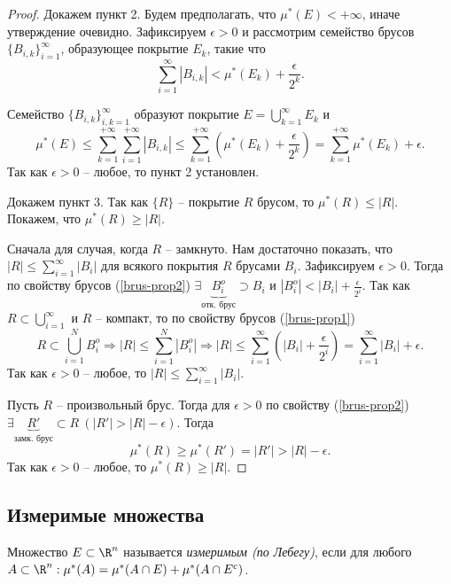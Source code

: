 \begin{proof}
    Докажем пункт 2. Будем предполагать, что $\mu^{*}(E) < +\infty$, иначе утверждение очевидно. Зафиксируем $\epsilon > 0$ и рассмотрим семейство брусов $\{B_{i, k}\}_{i = 1}^{\infty}$, образующее покрытие $E_{k}$, такие что
    \[\sum_{i = 1}^{\infty}|B_{i, k}| < \mu^{*}(E_{k}) + \frac{\epsilon}{2^{k}}.\]

    Семейство $\{B_{i, k}\}_{i, k = 1}^{\infty}$ образуют покрытие $E = \bigcup_{k = 1}^{\infty}E_{k}$ и 
    \[\mu^{*}(E) \leq \sum_{k = 1}^{+\infty}\sum_{i = 1}^{+\infty}|B_{i, k}| \leq \sum_{k = 1}^{+\infty}\left(\mu^{*}(E_{k}) + \frac{\epsilon}{2^{k}}\right) = \sum_{k = 1}^{+\infty} \mu^{*}(E_{k}) + \epsilon.\]
    Так как $\epsilon > 0$ -- любое, то пункт 2 установлен.

    Докажем пункт 3. Так как $\{R\}$ -- покрытие $R$ брусом, то $\mu^{*}(R) \leq |R|$. Покажем, что $\mu^{*}(R) \geq |R|$.
    
    Сначала для случая, когда $R$ -- замкнуто. Нам достаточно показать, что $|R| \leq \sum_{i = 1}^{\infty}|B_{i}|$ для всякого покрытия $R$ брусами $B_{i}$. Зафиксируем $\epsilon > 0$. Тогда по свойству брусов (\ref{brus-prop2}) $\exists \underbrace{B_{i}^{o}}_{\text{отк. брус}} \supset B_{i}$ и $|B_{i}^{o}| < |B_{i}| + \frac{\epsilon}{2^{i}}$. Так как $R \subset \bigcup_{i = 1}^{\infty}$ и $R$ -- компакт, то по свойству брусов (\ref{brus-prop1})
    \[R \subset \bigcup_{i = 1}^{N}B_{i}^{o} \Rightarrow |R| \leq \sum_{i = 1}^{N}|B_{i}^{o}| \Rightarrow |R| \leq \sum_{i = 1}^{\infty}\left(|B_{i}| + \frac{\epsilon}{2^{i}}\right) = \sum_{i = 1}^{\infty}|B_{i}| + \epsilon.\]
    Так как $\epsilon > 0$ -- любое, то $|R| \leq \sum_{i = 1}^{\infty}|B_{i}|$.

    Пусть $R$ -- произвольный брус. Тогда для $\epsilon > 0$ по свойству (\ref{brus-prop2}) $\exists \underbrace{R'}_{\text{замк. брус}} \subset R \ (|R'| > |R| - \epsilon)$. Тогда 
    \[\mu^{*}(R) \geq \mu^{*}(R') = |R'| > |R| - \epsilon.\]
    Так как $\epsilon > 0$ -- любое, то $\mu^{*}(R) \geq |R|$.
\end{proof}

\subsection{Измеримые множества}

\begin{definition}
    Множество $E \subset \R^{n}$ называется \textit{измеримым (по Лебегу)}, если для любого $A \subset \R^{n}: \mu^{*}(A) = \mu^{*}(A \cap E) + \mu^{*}(A \cap E^{c})$. 
\end{definition}